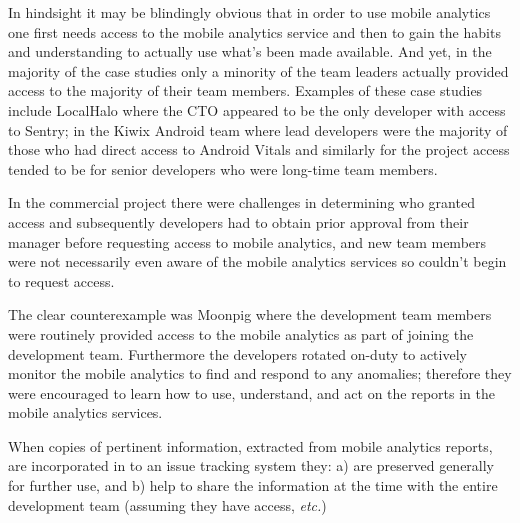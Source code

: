 In hindsight it may be blindingly obvious that in order to use mobile analytics one first needs access to the mobile analytics service and then to gain the habits and understanding to actually use what's been made available. And yet, in the majority of the case studies only a minority of the team leaders actually provided access to the majority of their team members. Examples of these case studies include LocalHalo where the CTO appeared to be the only developer with access to Sentry; in the Kiwix Android team where lead developers were the majority of those who had direct access to Android Vitals and similarly for the  project access tended to be for senior developers who were long-time team members.

In the commercial project there were challenges in determining who granted access and subsequently developers had to obtain prior approval from their manager before requesting access to mobile analytics, and new team members were not necessarily even aware of the mobile analytics services so couldn't begin to request access. 

The clear counterexample was Moonpig where the development team members were routinely provided access to the mobile analytics as part of joining the development team. Furthermore the developers rotated on-duty to actively monitor the mobile analytics to find and respond to any anomalies; therefore they were encouraged to learn how to use, understand, and act on the reports in the mobile analytics services.

When copies of pertinent information, extracted from mobile analytics reports, are incorporated in to an issue tracking system they: a) are preserved generally for further use, and b) help to share the information at the time with the entire development team (assuming they have access, \emph{etc.}) 

